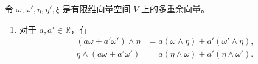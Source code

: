 \begin{proposition}[楔积的性质]
  令 $\omega,\omega',\eta,\eta',\xi$ 是有限维向量空间 $V$ 上的多重余向量。
  \begin{enumerate}
    \item 对于 $a,a'\in \mathbb{R}$，有
    \begin{align*}
      (a\omega+a'\omega')\wedge\eta&=a(\omega\wedge\eta)+a'(\omega'\wedge\eta),\\
      \eta\wedge(a\omega+a'\omega')&=a(\eta\wedge\omega)+a'(\eta\wedge\omega').
    \end{align*}
  \end{enumerate}
\end{proposition}


